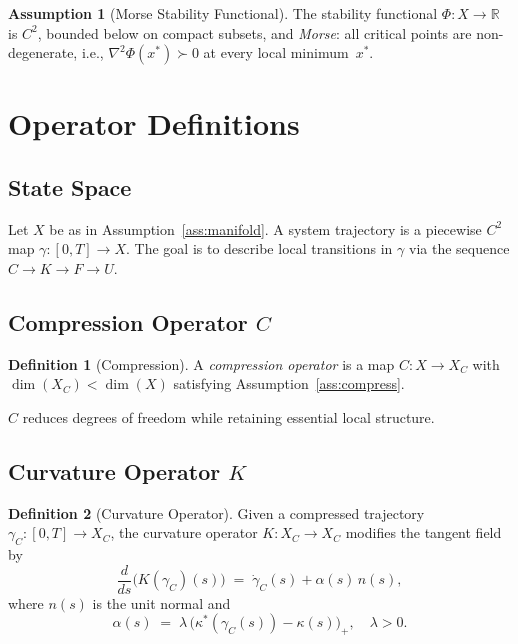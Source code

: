 \documentclass[12pt, oneside]{book}
\theoremstyle{plain}
\theoremstyle{definition}
\newtheorem{definition}{Definition}[section]
\newtheorem{assumption}{Assumption}[section]
\theoremstyle{remark}
\begin{document}
\begin{assumption}[Morse Stability Functional]\label{ass:morse}
The stability functional $\Phi : X \to \mathbb{R}$ is $C^2$, bounded
below on compact subsets, and \emph{Morse}: all critical points are
non-degenerate, i.e., $\nabla^2\Phi(x^*) \succ 0$ at every local
minimum~$x^*$.
\end{assumption}

\section{Operator Definitions}\label{sec:operators}

\subsection{State Space}

Let $X$ be as in Assumption~\ref{ass:manifold}. A system trajectory
is a piecewise $C^2$ map $\gamma : [0,T] \to X$. The goal is to
describe local transitions in $\gamma$ via the sequence
$C \to K \to F \to U$.

\subsection{Compression Operator \texorpdfstring{$C$}{C}}

\begin{definition}[Compression]
A \emph{compression operator} is a map $C : X \to X_C$ with
$\dim(X_C) < \dim(X)$ satisfying Assumption~\ref{ass:compress}.
\end{definition}

$C$ reduces degrees of freedom while retaining essential local
structure.

\subsection{Curvature Operator \texorpdfstring{$K$}{K}}

\begin{definition}[Curvature Operator]
Given a compressed trajectory $\gamma_C : [0,T] \to X_C$, the
curvature operator $K : X_C \to X_C$ modifies the tangent field by
\[
\frac{d}{ds}\bigl(K(\gamma_C)(s)\bigr)
\;=\; \dot\gamma_C(s) + \alpha(s)\,n(s),
\]
where $n(s)$ is the unit normal and
\[
\alpha(s) \;=\; \lambda\,\bigl(\kappa^*(\gamma_C(s))
  - \kappa(s)\bigr)_+, \quad \lambda > 0.
\]
\end{definition}
\end{document}
